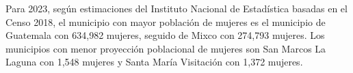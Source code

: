 Para 2023, según estimaciones del Instituto Nacional de Estadística basadas en el Censo 2018, el municipio con mayor población de mujeres es el municipio de Guatemala con 634,982 mujeres, seguido de Mixco con 274,793 mujeres. Los municipios con menor proyección poblacional de mujeres son San Marcos La Laguna con 1,548 mujeres y Santa María Visitación con 1,372 mujeres. 